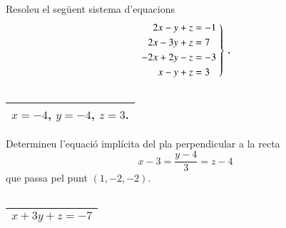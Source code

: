 \documentclass[11pt,catalan]{article}
\begin{document}
\begin{enunciat}
Resoleu el següent sistema d'equacions
\[
  \left.\aligned 2 x - y + z &= -1 \\ 2 x - 3 y + z &= 7 \\ - 2 x + 2 y - z &= -3 \\ x - y + z &= 3 \endaligned\;\right\}\,,
\]
\end{enunciat}

\begin{quadricula}
\begin{tabular}{|C{5cm}{0.5cm}|}
\hline
  \\
\hline
\end{tabular}
\end{quadricula}

\begin{solucio}
\begin{center}
\begin{tabular}{|C{5cm}{0.5cm}|}
\hline
$x=-4$, $y=-4$, $z=3$. \\
\hline
\end{tabular}
\end{center}
\end{solucio}


\begin{enunciat}
Determineu l'equació implícita del pla perpendicular a la recta 
\[
  x - 3 = \frac{y - 4}{3} = z - 4
\]
que passa pel punt $(1,-2,-2)$.
\end{enunciat}

\begin{quadricula}
\begin{tabular}{|C{5cm}{0.5cm}|}
\hline
  \\
\hline
\end{tabular}
\end{quadricula}

\begin{solucio}
\begin{center}
\begin{tabular}{|C{5cm}{0.5cm}|}
\hline
$x + 3 y + z = -7$ \\
\hline
\end{tabular}
\end{center}
\end{solucio}
\end{document}
